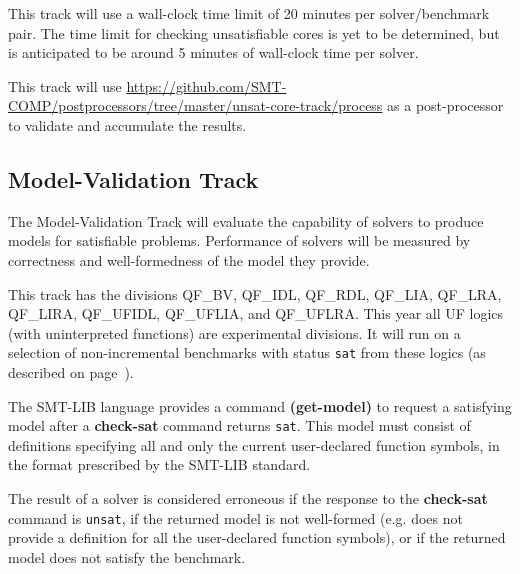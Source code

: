 \documentclass[12pt]{article}
\newcommand{\akey}[1]{\textbf{#1}\xspace}
\newcommand{\mvaltrack}{Model-Validation Track\xspace}
\begin{document}
This track will use a wall-clock time limit of 20 minutes per solver/benchmark
pair. The time limit for checking unsatisfiable cores is yet to be determined,
but is anticipated to be around 5 minutes of wall-clock time per solver.

This track will use
{\url{https://github.com/SMT-COMP/postprocessors/tree/master/unsat-core-track/process}}
as a post-processor
to validate and accumulate the results.

\subsection{\mvaltrack}
\label{sec:exec:model}
The \mvaltrack will evaluate the capability of solvers to produce models for
satisfiable problems.  Performance of solvers will be measured by correctness
and well-formedness of the model they provide.

This track has the divisions
QF\_BV, QF\_IDL, QF\_RDL, QF\_LIA, QF\_LRA, QF\_LIRA,
QF\_UFIDL, QF\_UFLIA, and QF\_UFLRA.
%
This year all UF logics (with uninterpreted functions) are experimental divisions.
%
It will run on a
selection of non-incremental benchmarks with status \texttt{sat} from these
logics (as described on page~\pageref{benchmark-selection}).

The SMT-LIB language provides a command \akey{(get-model)} to request a
satisfying model after a \akey{check-sat} command returns \texttt{sat}.  This
model must consist of definitions specifying all and only the current
user-declared function symbols, in the format prescribed by the SMT-LIB
standard.

The result of a solver is considered erroneous if the response to the
\akey{check-sat} command is \texttt{unsat}, if the returned model is not
well-formed (e.g. does not provide a definition for all the user-declared
function symbols), or if the returned model does not satisfy the benchmark.
\end{document}
